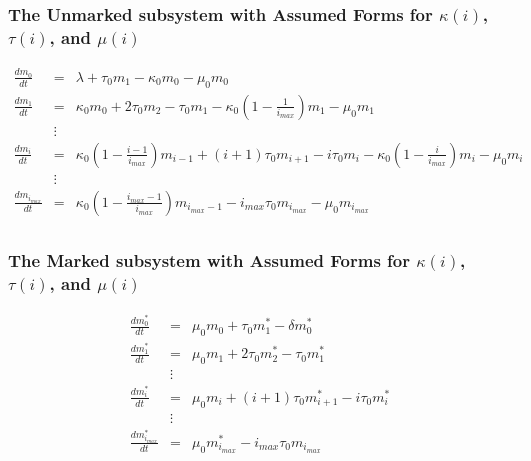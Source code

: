 \documentclass[review]{elsarticle}
\begin{document}
\subsubsection{The Unmarked subsystem with Assumed Forms for $\kappa(i)$, $\tau(i)$, and $\mu(i)$}\label{sec:unmarked_simp}
\begin{eqnarray*}
\frac{dm_{0}}{dt} & = & \lambda+\tau_0 m_{1}-\kappa_0 m_{0}-\mu_0 m_{0} \\
\frac{dm_{1}}{dt} & = & \kappa_0 m_{0}+2\tau_0 m_{2}-\tau_0 m_{1}-\kappa_0\left(1-\frac{1}{i_{max}}\right) m_{1}-\mu_0 m_{1}\\
& \vdots & \\
\frac{dm_{i}}{dt} & = & \kappa_0\left(1-\frac{i-1}{i_{max}}\right) m_{i-1}+(i+1)\tau_0 m_{i+1}-i\tau_0 m_{i}-\kappa_0\left(1-\frac{i}{i_{max}}\right) m_{i}-\mu_0 m_{i} \\
& \vdots & \\
\frac{dm_{i_{max}}}{dt} & = & \kappa_0\left(1-\frac{i_{max}-1}{i_{max}}\right) m_{i_{max}-1}-i_{max}\tau_0 m_{i_{max}}-\mu_0 m_{i_{max}} \\
\end{eqnarray*}

\subsubsection{The Marked subsystem with Assumed Forms for $\kappa(i)$, $\tau(i)$, and $\mu(i)$}\label{sec:marked_simp}
\begin{eqnarray*}
\frac{dm_{0}^{*}}{dt} & = & \mu_0 m_{0}+\tau_0 m_{1}^{*}-\delta m_{0}^{*} \\
\frac{dm_{1}^{*}}{dt} & = & \mu_0 m_{1}+2\tau_0 m_{2}^{*}- \tau_0 m_{1}^{*} \\
& \vdots & \\
\frac{dm_{i}^{*}}{dt} & = & \mu_0 m_{i}+(i+1)\tau_0 m_{i+1}^{*}-i\tau_0m_{i}^{*} \\
& \vdots & \\
\frac{dm_{i_{max}}^{*}}{dt} & = & \mu_0 m_{i_{max}}^{*}-i_{max}\tau_0 m_{i_{max}} \\
\end{eqnarray*}
\end{document}
